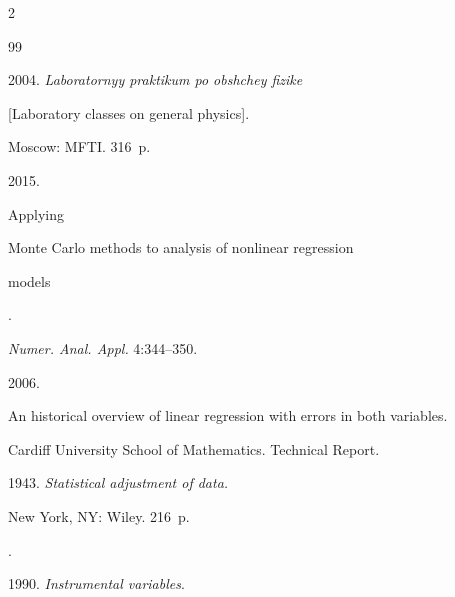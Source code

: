 


  \begin{multicols}{2}



\renewcommand{\bibname}{\protect\rmfamily References}




{\small\frenchspacing

 {%


 \begin{thebibliography}{99}




 2004. \textit{Laboratornyy praktikum po obshchey fizike} 

[Laboratory classes on general  physics].

Moscow: MFTI. 316~p.




 2015. {Applying

    Monte Carlo methods to analysis of nonlinear regression

    models}.

\textit{Numer. Anal. \mbox{Appl.}} 4:344--350.




 2006.  

{An historical overview of linear regression with errors in both variables}.

Cardiff University School of Mathematics. Technical Report.




 1943. \textit{Statistical adjustment of data.}

New York, NY: Wiley. 216~p.




.

 1990. \textit{Instrumental variables}.


\end{thebibliography}}}
\end{multicols}
